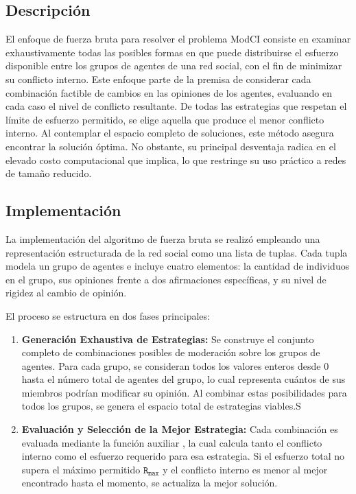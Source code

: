 \documentclass[11pt,letter]{article}
\begin{document}
    \subsection{Descripción}
    El enfoque de fuerza bruta para resolver el problema ModCI consiste en examinar exhaustivamente todas las posibles formas en que puede distribuirse el esfuerzo disponible entre los grupos de agentes de una red social, con el fin de minimizar su conflicto interno. Este enfoque parte de la premisa de considerar cada combinación factible de cambios en las opiniones de los agentes, evaluando en cada caso el nivel de conflicto resultante. De todas las estrategias que respetan el límite de esfuerzo permitido, se elige aquella que produce el menor conflicto interno. Al contemplar el espacio completo de soluciones, este método asegura encontrar la solución óptima. No obstante, su principal desventaja radica en el elevado costo computacional que implica, lo que restringe su uso práctico a redes de tamaño reducido.

    \subsection{Implementación}
    La implementación del algoritmo de fuerza bruta se realizó empleando una representación estructurada de la red social como una lista de tuplas. Cada tupla modela un grupo de agentes e incluye cuatro elementos: la cantidad de individuos en el grupo, sus opiniones frente a dos afirmaciones específicas, y su nivel de rigidez al cambio de opinión.

    El proceso se estructura en dos fases principales:

    \begin{enumerate}
        \item \textbf{Generación Exhaustiva de Estrategias:} Se construye el conjunto completo de combinaciones posibles de moderación sobre los grupos de agentes. Para cada grupo, se consideran todos los valores enteros desde 0 hasta el número total de agentes del grupo, lo cual representa cuántos de sus miembros podrían modificar su opinión. Al combinar estas posibilidades para todos los grupos, se genera el espacio total de estrategias viables.S
        \item \textbf{Evaluación y Selección de la Mejor Estrategia:} Cada combinación es evaluada mediante la función auxiliar , la cual calcula tanto el conflicto interno como el esfuerzo requerido para esa estrategia. Si el esfuerzo total no supera el máximo permitido $\mathtt{R_{\text{max}}}$ y el conflicto interno es menor al mejor encontrado hasta el momento, se actualiza la mejor solución.
    \end{enumerate}
\end{document}
